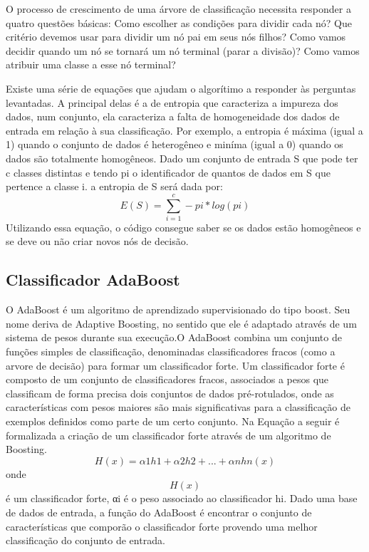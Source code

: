 O processo de crescimento de uma árvore de classificação necessita responder a quatro questões básicas: Como escolher as condições para dividir cada nó? Que critério devemos usar para dividir um nó pai em seus nós filhos? Como vamos decidir quando um nó se tornará um nó terminal (parar a divisão)? Como vamos atribuir uma classe a esse nó terminal?

Existe uma série de equações que ajudam o algorítimo a responder às perguntas levantadas. A principal delas é a de entropia que caracteriza a impureza dos dados, num conjunto, ela caracteriza a falta de homogeneidade dos dados de entrada em relação à sua classificação. Por exemplo, a entropia é máxima (igual a 1) quando o conjunto de dados é heterogêneo e miníma (igual a 0) quando os dados são totalmente homogêneos. Dado um conjunto de entrada S que pode ter c classes distintas e tendo pi o identificador de quantos de dados em S que pertence a classe i. a entropia de S será dada por:
\begin{equation}
E(S) = \sum_{i=1}^{c}-pi*log(pi)
\end{equation}
Utilizando essa equação, o código consegue saber se os dados estão homogêneos e se deve ou não criar novos nós de decisão\cite{arvored}. 




\subsection{{Classificador AdaBoost}}

O AdaBoost é um algoritmo de aprendizado supervisionado do tipo boost. Seu nome deriva de Adaptive Boosting, no sentido que ele é adaptado através de um sistema de pesos durante sua execução.O AdaBoost combina um conjunto de funções simples de classificação, denominadas classificadores fracos (como a arvore de decisão) para formar um classificador forte. 
Um classificador forte é composto de um conjunto de classificadores fracos, associados
a pesos que classificam de forma precisa dois conjuntos de dados pré-rotulados, onde as
características com pesos maiores são mais significativas para a classificação de exemplos definidos como parte de um certo conjunto. Na Equação a seguir é formalizada a criação de um classificador forte através de um algoritmo de Boosting.
\begin{equation}
H(x) = α1h1 + α2h2 + ... + αnhn(x)
\end{equation}
onde \[H(x)\] é um classificador forte, αi é o peso associado ao classificador hi. 
Dado uma base de dados de entrada, a função do AdaBoost é encontrar o conjunto de características que comporão o classificador forte provendo uma melhor classificação do conjunto de entrada\cite{AdaBoost}.




